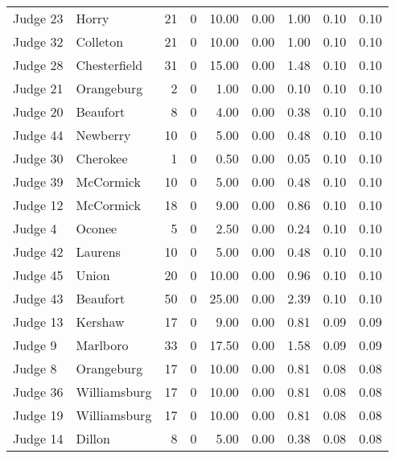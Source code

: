 \begin{tabular}{llrrrrrrr}
Judge 23 &        Horry &    21 &      0 & 10.00 &       0.00 &      1.00 &         0.10 &      0.10 \\
Judge 32 &     Colleton &    21 &      0 & 10.00 &       0.00 &      1.00 &         0.10 &      0.10 \\
Judge 28 & Chesterfield &    31 &      0 & 15.00 &       0.00 &      1.48 &         0.10 &      0.10 \\
Judge 21 &   Orangeburg &     2 &      0 &  1.00 &       0.00 &      0.10 &         0.10 &      0.10 \\
Judge 20 &     Beaufort &     8 &      0 &  4.00 &       0.00 &      0.38 &         0.10 &      0.10 \\
Judge 44 &     Newberry &    10 &      0 &  5.00 &       0.00 &      0.48 &         0.10 &      0.10 \\
Judge 30 &     Cherokee &     1 &      0 &  0.50 &       0.00 &      0.05 &         0.10 &      0.10 \\
Judge 39 &    McCormick &    10 &      0 &  5.00 &       0.00 &      0.48 &         0.10 &      0.10 \\
Judge 12 &    McCormick &    18 &      0 &  9.00 &       0.00 &      0.86 &         0.10 &      0.10 \\
 Judge 4 &       Oconee &     5 &      0 &  2.50 &       0.00 &      0.24 &         0.10 &      0.10 \\
Judge 42 &      Laurens &    10 &      0 &  5.00 &       0.00 &      0.48 &         0.10 &      0.10 \\
Judge 45 &        Union &    20 &      0 & 10.00 &       0.00 &      0.96 &         0.10 &      0.10 \\
Judge 43 &     Beaufort &    50 &      0 & 25.00 &       0.00 &      2.39 &         0.10 &      0.10 \\
Judge 13 &      Kershaw &    17 &      0 &  9.00 &       0.00 &      0.81 &         0.09 &      0.09 \\
 Judge 9 &     Marlboro &    33 &      0 & 17.50 &       0.00 &      1.58 &         0.09 &      0.09 \\
 Judge 8 &   Orangeburg &    17 &      0 & 10.00 &       0.00 &      0.81 &         0.08 &      0.08 \\
Judge 36 & Williamsburg &    17 &      0 & 10.00 &       0.00 &      0.81 &         0.08 &      0.08 \\
Judge 19 & Williamsburg &    17 &      0 & 10.00 &       0.00 &      0.81 &         0.08 &      0.08 \\
Judge 14 &       Dillon &     8 &      0 &  5.00 &       0.00 &      0.38 &         0.08 &      0.08 \\

\end{tabular}

